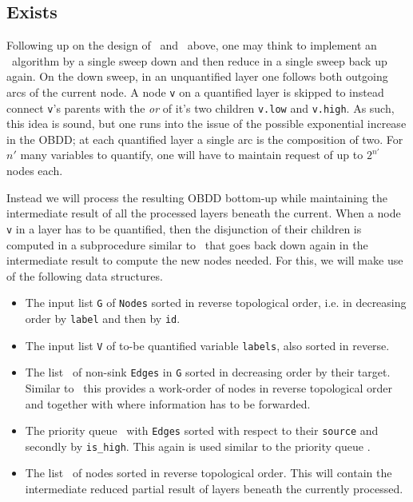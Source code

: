 \subsection{Exists} \label{sec:theory__exists}

Following up on the design of \Restrict\ and \Apply\ above, one may think to
implement an \Exists\ algorithm by a single sweep down and then reduce in a single
sweep back up again. On the down sweep, in an unquantified layer one follows
both outgoing arcs of the current node. A node \lstinline{v} on a quantified
layer is skipped to instead connect \lstinline{v}'s parents with the \emph{or}
of it's two children \lstinline{v.low} and \lstinline{v.high}. As such, this
idea is sound, but one runs into the issue of the possible exponential increase
in the OBDD; at each quantified layer a single arc is the composition of two.
For $n'$ many variables to quantify, one will have to maintain request of up to
$2^{n'}$ nodes each. 

Instead we will process the resulting OBDD bottom-up while maintaining the
intermediate result of all the processed layers beneath the current. When a node
\lstinline{v} in a layer has to be quantified, then the disjunction of their
children is computed in a subprocedure similar to \Apply\ that goes back down
again in the intermediate result to compute the new nodes needed. For this, we
will make use of the following data structures.

\begin{itemize}
\item The input list \lstinline{G} of \lstinline{Nodes} sorted in reverse
  topological order, i.e. in decreasing order by \lstinline{label} and then by
  \lstinline{id}.

\item The input list \lstinline{V} of to-be quantified variable
  \lstinline{labels}, also sorted in reverse.

\item The list \ExistsLforward\ of non-sink \lstinline{Edges} in \lstinline{G}
  sorted in decreasing order by their target. Similar to \ReduceLforward\ this
  provides a work-order of nodes in reverse topological order and together with
  where information has to be forwarded.

\item The priority queue \ExistsQdep\ with \lstinline{Edges} sorted with respect
  to their \lstinline{source} and secondly by \lstinline{is_high}. This again is
  used similar to the priority queue \ReduceQdep.

\item The list \ExistsLres\ of nodes sorted in reverse topological order. This
  will contain the intermediate reduced partial result of layers beneath the
  currently processed.
\end{itemize}

